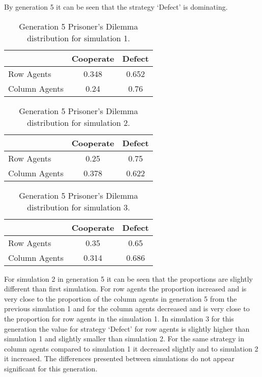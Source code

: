 By generation 5 it can be seen that the strategy `Defect' is dominating.

\begin{table}[H]
\begin{center}
\begin{tabular}{|l|c|c|}
\hline
& Cooperate & Defect \\ 
\hline
Row Agents & 0.348 & 0.652\\
\hline
Column Agents & 0.24 & 0.76\\
\hline
\end{tabular}
\end{center}
\caption{ Generation 5 Prisoner’s Dilemma distribution for simulation 1.}
\label{tab:pds1g5}
\end{table}

\begin{table}[H]
\begin{center}
\begin{tabular}{|l|c|c|}
\hline
& Cooperate & Defect \\ 
\hline
Row Agents & 0.25 & 0.75\\
\hline
Column Agents & 0.378 & 0.622\\
\hline
\end{tabular}
\end{center}
\caption{Generation 5 Prisoner’s Dilemma distribution for simulation 2.}
\label{tab:pds2g5}
\end{table}

\begin{table}[H]
\begin{center}
\begin{tabular}{|l|c|c|}
\hline
& Cooperate & Defect \\ 
\hline
Row Agents & 0.35 & 0.65\\
\hline
Column Agents & 0.314 & 0.686\\
\hline
\end{tabular}
\end{center}
\caption{Generation 5 Prisoner’s Dilemma distribution for simulation 3.}
\label{tab:pds3g5}
\end{table}
For simulation 2 in generation 5 it can be seen that the proportions are slightly different than first simulation. For row agents the proportion increased and is very close to the proportion of the column agents in generation 5 from the previous simulation 1 and for the column agents decreased and is very close to the proportion for row agents in the simulation 1.
In simulation 3 for this generation the value for strategy `Defect' for row agents is slightly higher than simulation 1 and slightly smaller than simulation 2. For the same strategy in column agents compared to simulation 1 it decreased slightly and to simulation 2 it increased. The differences presented between simulations do not appear significant for this generation.

